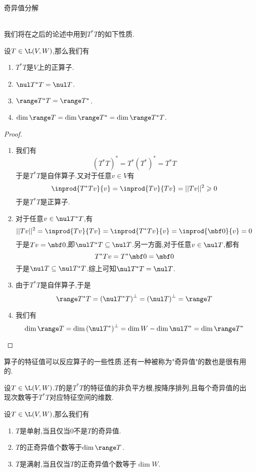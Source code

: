 \documentclass{ctexart}
\begin{document}
\pagestyle{empty}
\begin{center}\large 奇异值分解\end{center}
\\
我们将在之后的论述中用到$T^*T$的如下性质.
\begin{formal}[1.1 $T^*T$的性质]
    设$T\in\L(V,W)$,那么我们有
    \begin{enumerate}[label=\tbf{(\alph*)}]
        \item $T^*T$是$V$上的正算子.
        \item $\nul T^*T=\nul T$.
        \item $\range T^*T=\range T^*$.
        \item $\dim\range T=\dim\range T^*=\dim\range T^*T$.
    \end{enumerate}
\end{formal}
\begin{proof}
    \begin{enumerate}[label=\tbf{(\alph*)}]
        \item 我们有
            \[\left(T^*T\right)^*=T^*\left(T^*\right)^*=T^*T\]
            于是$T^*T$是自伴算子.又对于任意$v\in V$有
            \[\inprod{T^*Tv}{v}=\inprod{Tv}{Tv}=||Tv||^2\geqslant0\]
            于是$T^*T$是正算子.
        \item 对于任意$v\in\nul T^*T$,有
            \[||Tv||^2=\inprod{Tv}{Tv}=\inprod{T^*Tv}{v}=\inprod{\mbf0}{v}=0\]
            于是$Tv=\mbf0$,即$\nul T^*T\subseteq\nul T$.另一方面,对于任意$v\in \nul T$,都有
            \[T^*Tv=T^*\mbf0=\mbf0\]
            于是$\nul T\subseteq\nul T^*T$.综上可知$\nul T^*T=\nul T$.
        \item 由于$T^*T$是自伴算子,于是
            \[\range T^*T=\left(\nul T^*T\right)^\bot=\left(\nul T\right)^\bot=\range T\]
        \item 我们有
            \[\dim\range T=\dim\left(\nul T^*\right)^\bot=\dim W-\dim\nul T^*=\dim\range T^*\]
    \end{enumerate}
\end{proof}\noindent
算子的特征值可以反应算子的一些性质.还有一种被称为"奇异值"的数也是很有用的.
\begin{definition}[1.2 定义:奇异值]
    设$T\in\L(V,W)$.$T$的是$T^*T$的特征值的非负平方根,按降序排列,且每个奇异值的出现次数等于$T^*T$对应特征空间的维数.
\end{definition}
\begin{formal}[1.3 正奇异值的作用]
    设$T\in\L(V,W)$,那么我们有
    \begin{enumerate}[label=\tbf{(\alph*)}]
        \item $T$是单射,当且仅当$0$不是$T$的奇异值.
        \item $T$的正奇异值个数等于$\dim\range T$.
        \item $T$是满射,当且仅当$T$的正奇异值个数等于$\dim W$.
    \end{enumerate}
\end{formal}
\end{document}
